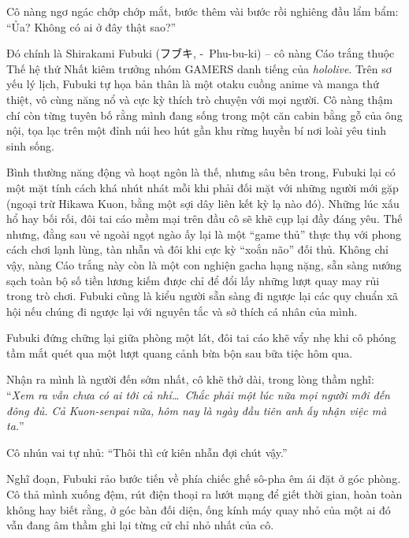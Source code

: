 \documentclass[../main.tex]{subfiles}
\begin{document}
Cô nàng ngơ ngác chớp chớp mắt, bước thêm vài bước rồi nghiêng đầu lẩm bẩm: ``Ủa? Không có ai ở đây thật sao?''

\chrint

Đó chính là Shirakami Fubuki (フブキ, -\ Phu-bu-ki) – cô nàng Cáo trắng thuộc Thế hệ thứ Nhất kiêm trưởng nhóm GAMERS danh tiếng của \textit{hololive}. Trên sơ yếu lý lịch, Fubuki tự họa bản thân là một otaku cuồng anime và manga thứ thiệt, vô cùng năng nổ và cực kỳ thích trò chuyện với mọi người. Cô nàng thậm chí còn từng tuyên bố rằng mình đang sống trong một căn cabin bằng gỗ của ông nội, tọa lạc trên một đỉnh núi heo hút gần khu rừng huyền bí nơi loài yêu tinh sinh sống.

Bình thường năng động và hoạt ngôn là thế, nhưng sâu bên trong, Fubuki lại có một mặt tính cách khá nhút nhát mỗi khi phải đối mặt với những người mới gặp (ngoại trừ Hikawa Kuon, bằng một sợi dây liên kết kỳ lạ nào đó). Những lúc xấu hổ hay bối rối, đôi tai cáo mềm mại trên đầu cô sẽ khẽ cụp lại đầy đáng yêu. Thế nhưng, đằng sau vẻ ngoài ngọt ngào ấy lại là một ``game thủ'' thực thụ với phong cách chơi lạnh lùng, tàn nhẫn và đôi khi cực kỳ ``xoắn não'' đối thủ. Không chỉ vậy, nàng Cáo trắng này còn là một con nghiện gacha hạng nặng, sẵn sàng nướng sạch toàn bộ số tiền lương kiếm được chỉ để đổi lấy những lượt quay may rủi trong trò chơi. Fubuki cũng là kiểu người sẵn sàng đi ngược lại các quy chuẩn xã hội nếu chúng đi ngược lại với nguyên tắc và sở thích cá nhân của mình.

Fubuki đứng chững lại giữa phòng một lát, đôi tai cáo khẽ vẩy nhẹ khi cô phóng tầm mắt quét qua một lượt quang cảnh bừa bộn sau bữa tiệc hôm qua.

Nhận ra mình là người đến sớm nhất, cô khẽ thở dài, trong lòng thầm nghĩ: ``\textit{Xem ra vẫn chưa có ai tới cả nhỉ\dots\ Chắc phải một lúc nữa mọi người mới đến đông đủ. Cả Kuon-senpai nữa, hôm nay là ngày đầu tiên anh ấy nhận việc mà ta.}''

Cô nhún vai tự nhủ: ``Thôi thì cứ kiên nhẫn đợi chút vậy.''

Nghĩ đoạn, Fubuki rảo bước tiến về phía chiếc ghế sô-pha êm ái đặt ở góc phòng. Cô thả mình xuống đệm, rút điện thoại ra lướt mạng để giết thời gian, hoàn toàn không hay biết rằng, ở góc bàn đối diện, ống kính máy quay nhỏ của một ai đó vẫn đang âm thầm ghi lại từng cử chỉ nhỏ nhất của cô.

\ct

\end{document}
